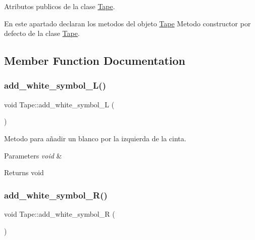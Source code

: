 Atributos publicos de la clase \hyperlink{class_tape}{Tape}. 

En este apartado declaran los metodos del objeto \hyperlink{class_tape}{Tape} Metodo constructor por defecto de la clase \hyperlink{class_tape}{Tape}. 

\subsection{Member Function Documentation}
\hypertarget{class_tape_a99d0cd086b4ccb83e0f2590796f8dacc}{}\label{class_tape_a99d0cd086b4ccb83e0f2590796f8dacc} 
\subsubsection{\texorpdfstring{add\+\_\+white\+\_\+symbol\+\_\+\+L()}{add\_white\_symbol\_L()}}
{\footnotesize\ttfamily void Tape\+::add\+\_\+white\+\_\+symbol\+\_\+L (\begin{DoxyParamCaption}\item[{void}]{ }\end{DoxyParamCaption})}



Metodo para añadir un blanco por la izquierda de la cinta. 


\begin{DoxyParams}{Parameters}
{\em void} & \\
\hline
\end{DoxyParams}
\begin{DoxyReturn}{Returns}
void 
\end{DoxyReturn}
\hypertarget{class_tape_ae687a3b6a936925e200e38d68d402fa6}{}\label{class_tape_ae687a3b6a936925e200e38d68d402fa6} 
\subsubsection{\texorpdfstring{add\+\_\+white\+\_\+symbol\+\_\+\+R()}{add\_white\_symbol\_R()}}
{\footnotesize\ttfamily void Tape\+::add\+\_\+white\+\_\+symbol\+\_\+R (\begin{DoxyParamCaption}\item[{void}]{ }\end{DoxyParamCaption})}



